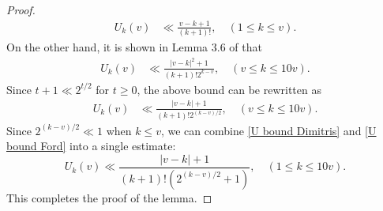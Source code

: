 \documentclass{amsart}
\theoremstyle{definition}
\numberwithin{equation}{section}
\begin{document}
\begin{proof}
\begin{align}
				U_k(v) &\ll \frac{v-k+1}{(k+1)!}, \quad (1 \leq k \leq v).
			\end{align}
			On the other hand, it is shown in Lemma 3.6 of \cite{ford2006integers} that
			\begin{align*}
				U_k(v) &\ll \frac{|v-k|^2+1}{(k+1)!2^{k-v}}, \quad (v \leq k \leq 10v).
			\end{align*}
			Since $t+1 \ll 2^{t/2}$ for $t \geq 0$, the above bound can be rewritten as
			\begin{align}\label{U bound Ford}
				U_k(v) &\ll \frac{|v-k|+1}{(k+1)!2^{(k-v)/2}}, \quad (v \leq k \leq 10v).
			\end{align}
			Since $2^{(k-v)/2} \ll 1$ when $k \le v$, we can combine \eqref{U bound Dimitris} and \eqref{U bound Ford} into a single estimate:
			$$U_k(v) \ll \frac{|v-k|+1}{(k+1)!(2^{(k-v)/2}+1)}, \quad (1 \leq k \leq 10v).$$
			This completes the proof of the lemma.\end{proof}
			
\end{document}
